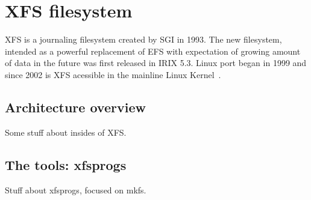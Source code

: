 
\chapter{XFS filesystem}

XFS is a journaling filesystem created by SGI in 1993. The new filesystem, intended as a powerful replacement of EFS with expectation of growing amount of data in the future was first released in IRIX 5.3. Linux port began in 1999 and since 2002 is XFS acessible in the mainline Linux Kernel~\cite[Chap. 1.2, 1.3]{xfsHistory}.



\section{Architecture overview}
Some stuff about insides of XFS.

\section{The tools: xfsprogs}
Stuff about xfsprogs, focused on mkfs.


